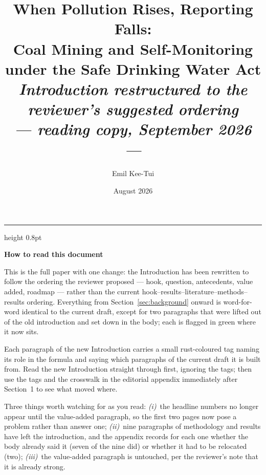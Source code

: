 \documentclass[12pt]{article}
\newenvironment{editnote}[1]{%
  \par\medskip\noindent
  \begin{minipage}{\linewidth}%
  {\color{boxrule}\hrule height 0.8pt}\smallskip
  {\sffamily\bfseries\small #1\par}\smallskip
  \small\singlespacing\raggedright
  \setlength{\parindent}{0pt}\setlength{\parskip}{0.5em}\ignorespaces
}{%
  \par\smallskip{\color{boxrule}\hrule height 0.8pt}%
  \end{minipage}\par\medskip
}
\begin{document}
\title{When Pollution Rises, Reporting Falls:\\ Coal Mining and Self-Monitoring under the Safe Drinking Water Act\\[0.6em]
{\large\normalfont\itshape Introduction restructured to the reviewer's suggested ordering\\ --- reading copy, September 2026 ---}}
\author{Emil Kee-Tui}
\date{August 2026}
\maketitle
\thispagestyle{empty}
\singlespacing
\vspace{-1.5em}

\begin{editnote}{How to read this document}
This is the full paper with one change: the Introduction has been rewritten to follow
the ordering the reviewer proposed --- hook, question, antecedents, value added,
roadmap --- rather than the current hook--results--literature--methods--results
ordering. Everything from Section~\ref{sec:background} onward is word-for-word
identical to the current draft, except for two paragraphs that were lifted out of the
old introduction and set down in the body; each is flagged in
{\sffamily\color{movedcol}green} where it now sits.

Each paragraph of the new Introduction carries a small
{\sffamily\color{annotcol}rust-coloured} tag naming its role in the formula and saying
which paragraphs of the current draft it is built from. Read the new Introduction
straight through first, ignoring the tags; then use the tags and the crosswalk in the
editorial appendix immediately after Section~1 to see what moved where.

Three things worth watching for as you read:
\emph{(i)}~the headline numbers no longer appear until the value-added paragraph, so
the first two pages now pose a problem rather than answer one;
\emph{(ii)}~nine paragraphs of methodology and results have left the introduction, and
the appendix records for each one whether the body already said it (seven of the nine
did) or whether it had to be relocated (two);
\emph{(iii)}~the value-added paragraph is untouched, per the reviewer's note that it is
already strong.
\end{editnote}
\end{document}
